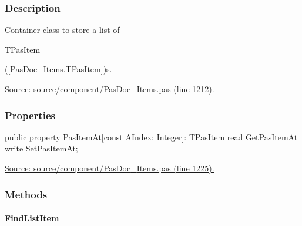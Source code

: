 \documentclass{report}
\newif\ifpdf
\begin{document}
\subsubsection*{\large{\textbf{Description}}\normalsize\hspace{1ex}\hfill}
Container class to store a list of \begin{ttfamily}TPasItem\end{ttfamily}(\ref{PasDoc_Items.TPasItem})s.\par
\href{https://github.com/pasdoc/pasdoc/blob/master/source/component/PasDoc_Items.pas#L1212}{Source: source/component/PasDoc{\_}Items.pas (line 1212).}\subsubsection*{\large{\textbf{Properties}}\normalsize\hspace{1ex}\hfill}
\begin{list}{}{
\setlength{\itemindent}{0cm}
\setlength{\listparindent}{0cm}
\setlength{\leftmargin}{\evensidemargin}
\addtolength{\leftmargin}{\tmplength}
\settowidth{\labelsep}{X}
\addtolength{\leftmargin}{\labelsep}
\setlength{\labelwidth}{\tmplength}
}
\label{PasDoc_Items.TPasItems-PasItemAt}
\item[\textbf{PasItemAt}\hfill]
\ifpdf
\begin{flushleft}
\fi
\begin{ttfamily}
public property PasItemAt[const AIndex: Integer]: TPasItem read GetPasItemAt
      write SetPasItemAt;\end{ttfamily}

\ifpdf
\end{flushleft}
\fi


\par  \par
\href{https://github.com/pasdoc/pasdoc/blob/master/source/component/PasDoc_Items.pas#L1225}{Source: source/component/PasDoc{\_}Items.pas (line 1225).}\end{list}
\subsubsection*{\large{\textbf{Methods}}\normalsize\hspace{1ex}\hfill}
\paragraph*{FindListItem}\hspace*{\fill}
\end{document}
